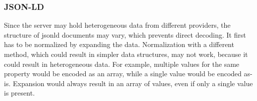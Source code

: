 \subsubsection{JSON-LD}\label{sec:jsonld}

Since the server may hold heterogeneous data from different providers, the structure of \gls{jsonld} documents may vary, which prevents direct decoding. It first has to be normalized by expanding the data. Normalization with a different method, which could result in simpler data structures, may not work, because it could result in heterogeneous data. For example, multiple values for the same property would be encoded as an array, while a single value would be encoded as-is. Expansion would always result in an array of values, even if only a single value is present.
